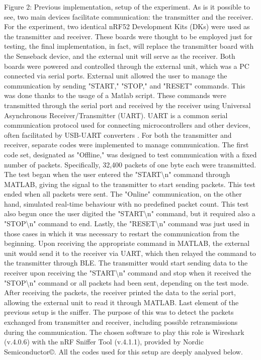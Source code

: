 \documentclass{Configuration_Files/PoliMi3i_thesis}
\begin{document}
Figure 2: Previous implementation, setup of the experiment.
As is it possible to see, two main devices facilitate communication: the transmitter and the receiver. For the experiment, two identical nRF52 Development Kits (DKs) \cite{NRF52DKDevelopment} were used as the transmitter and receiver. These boards were thought to be employed just for testing, the final implementation, in fact, will replace the transmitter board with the Senseback device, and the external unit will serve as the receiver. Both boards were powered and controlled through the external unit, which was a PC connected via serial ports.
External unit allowed the user to manage the communication by sending "START," "STOP," and "RESET" commands. This was done thanks to the usage of a Matlab script. These commands were transmitted through the serial port and received by the receiver using Universal Asynchronous Receiver/Transmitter (UART). UART is a common serial communication protocol used for connecting microcontrollers and other devices, often facilitated by USB-UART converters \cite{LessonSerialCommunication}.
For both the transmitter and receiver, separate codes were implemented to manage communication. The first code set, designated as "Offline," was designed to test communication with a fixed number of packets. Specifically, 32,400 packets of one byte each were transmitted. The test began when the user entered the "START{\textbackslash}n" command through MATLAB, giving the signal to the transmitter to start sending packets. This test ended when all packets were sent. The "Online" communication, on the other hand, simulated real-time behaviour with no predefined packet count. This test also begun once the user digited the "START{\textbackslash}n" command, but it required also a "STOP{\textbackslash}n" command to end. Lastly, the "RESET{\textbackslash}n" command was just used in those cases in which it was necessary to restart the communication from the beginning.
Upon receiving the appropriate command in MATLAB, the external unit would send it to the receiver via UART, which then relayed the command to the transmitter through BLE. The transmitter would start sending data to the receiver upon receiving the "START{\textbackslash}n" command and stop when it received the "STOP{\textbackslash}n" command or all packets had been sent, depending on the test mode. After receiving the packets, the receiver printed the data to the serial port, allowing the external unit to read it through MATLAB. 
Last element of the previous setup is the sniffer. The purpose of this was to detect the packets exchanged from transmitter and receiver, including possible retransmissions during the communication. The chosen software to play this role is Wireshark (v.4.0.6) with the nRF Sniffer Tool (v.4.1.1), provided by Nordic Semiconductor©.
All the codes used for this setup are deeply analysed below.
\end{document}
